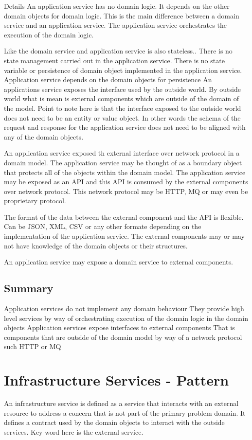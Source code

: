 Details
An application service has no domain logic. It depends on the other domain objects for domain logic.
This is the main difference between a domain service and an application service.
The application service orchestrates the execution of the domain logic.

Like the domain service and application service is also stateless..
There is no state management carried out in the application service.
There is no state variable or persistence of domain object implemented in the application service.
Application service depends on the domain objects for persistence
An applications service exposes the interface used by the outside world.
By outside world what is mean is external components which are outside of the domain of the model.
Point to note here is that the interface exposed to the outside world does not need to be an entity or value object.
In other words the schema of the request and response for the application service does not need to be aligned with any of the domain objects.

An application service exposed th external interface over network protocol in a domain model.
The application service may be thought of as a boundary object that protects all of the objects within the domain model.
The application service may be exposed as an API and this API is consumed by the external components over network protocol.
This network protocol may be HTTP, MQ or may even be proprietary protocol.

The format of the data between the external component and the API is flexible.
Can be JSON, XML, CSV or any other formate depending on the implementation of the application service.
The external components may or may not have knowledge of the domain objects or their structures.

An application service may expose a domain service to external components.

\subsection{Summary}
Application services do not implement any domain behaviour
They provide high level services by way of orchestrating execution of the domain logic in the domain objects
Application services expose interfaces to external components
That is components that are outside of the domain model by way of a network protocol such HTTP or MQ

\section{Infrastructure Services - Pattern}
An infrastructure service is defined as a service that interacts with an external resource to address a concern that is not part of the primary problem domain.
It defines a contract used by the domain objects to interact with the outside services.
Key word here is the external service.


